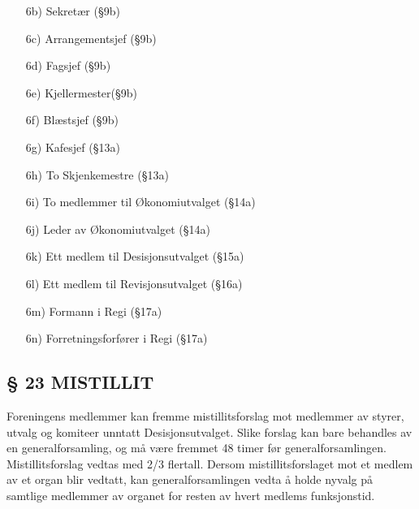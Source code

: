 \begin{itemize}
\begin{itemize}
\begin{itemize}
                \item[6b)] Sekretær (§9b) 

                \item[6c)] Arrangementsjef (§9b) 

                \item[6d)] Fagsjef (§9b) 

                \item[6e)] Kjellermester(§9b) 

                \item[6f)] Blæstsjef (§9b) 

                \item[6g)] Kafesjef (§13a) 

                \item[6h)] To Skjenkemestre (§13a)

                \item[6i)] To medlemmer til Økonomiutvalget (§14a)

                \item[6j)] Leder av Økonomiutvalget (§14a) 

                \item[6k)] Ett medlem til Desisjonsutvalget (§15a) 

                \item[6l)] Ett medlem til Revisjonsutvalget (§16a) 

                \item[6m)] Formann i Regi (§17a) 

                \item[6n)] Forretningsforfører i Regi (§17a) 
                \end{itemize}
        \end{itemize}
\end{itemize}


\subsection*{§ 23 MISTILLIT}

Foreningens medlemmer kan fremme mistillitsforslag mot medlemmer av
styrer, utvalg og komiteer unntatt Desisjonsutvalget. Slike forslag
kan bare behandles av en generalforsamling, og må være fremmet 48
timer før generalforsamlingen. Mistillitsforslag vedtas med 2/3
flertall.  Dersom mistillitsforslaget mot et medlem av et organ blir
vedtatt, kan generalforsamlingen vedta å holde nyvalg på samtlige
medlemmer av organet for resten av hvert medlems funksjonstid.


